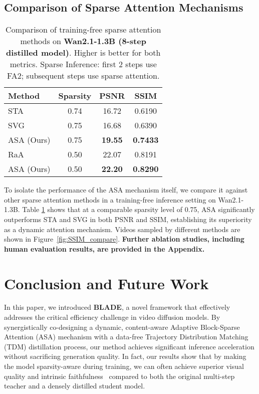 \documentclass[letterpaper]{article} %
\begin{document}
\subsection{Comparison of Sparse Attention Mechanisms} 

\begin{table}[h]
\centering
\caption{Comparison of training-free sparse attention methods on \textbf{Wan2.1-1.3B (8-step distilled model)}. Higher is better for both metrics. Sparse Inference: first 2 steps use FA2; subsequent steps use sparse attention.}
\label{tab:ablation_attn}
\begin{tabular}{lccc}
\toprule
\textbf{Method} & \textbf{Sparsity} & \textbf{PSNR} & \textbf{SSIM} \\
\midrule
STA & 0.74 & 16.72 & 0.6190 \\
SVG & 0.75 & 16.68 & 0.6390 \\
ASA (Ours) & 0.75 & \textbf{19.55} & \textbf{0.7433} \\
\midrule
RaA & 0.50 & 22.07 & 0.8191 \\
ASA (Ours) & 0.50 & \textbf{22.20} & \textbf{0.8290} \\
\bottomrule
\end{tabular}
\end{table}
To isolate the performance of the ASA mechanism itself, we compare it against other sparse attention methods in a training-free inference setting on Wan2.1-1.3B. Table \ref{tab:ablation_attn} shows that at a comparable sparsity level of 0.75, ASA significantly outperforms STA and SVG in both PSNR and SSIM, establishing its superiority as a dynamic attention mechanism. Videos sampled by different methods are shown in Figure~\ref{fig:SSIM_compare}.
\textbf{Further ablation studies, including human evaluation results, are provided in the Appendix.}


\section{Conclusion and Future Work}
In this paper, we introduced \textbf{BLADE}, a novel framework that effectively addresses the critical efficiency challenge in video diffusion models. By synergistically co-designing a dynamic, content-aware Adaptive Block-Sparse Attention (ASA) mechanism with a data-free Trajectory Distribution Matching (TDM) distillation process, our method achieves significant inference acceleration without sacrificing generation quality. In fact, our results show that by making the model sparsity-aware during training, we can often achieve superior visual quality and intrinsic faithfulness~\cite{zheng2025vbench2} compared to both the original multi-step teacher and a densely distilled student model.
\end{document}
